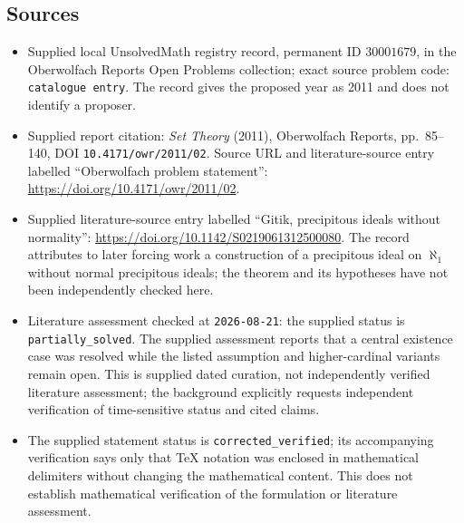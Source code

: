 \documentclass[11pt]{article}
\begin{document}
\subsection{Sources}
\begin{itemize}
\item Supplied local UnsolvedMath registry record, permanent ID \(30001679\), in the Oberwolfach Reports Open Problems collection; exact source problem code: \texttt{catalogue entry}. The record gives the proposed year as 2011 and does not identify a proposer.
\item Supplied report citation: \emph{Set Theory} (2011), Oberwolfach Reports, pp.~85--140, DOI \texttt{10.4171/owr/2011/02}. Source URL and literature-source entry labelled ``Oberwolfach problem statement'': \url{https://doi.org/10.4171/owr/2011/02}.
\item Supplied literature-source entry labelled ``Gitik, precipitous ideals without normality'': \url{https://doi.org/10.1142/S0219061312500080}. The record attributes to later forcing work a construction of a precipitous ideal on \(\aleph_1\) without normal precipitous ideals; the theorem and its hypotheses have not been independently checked here.
\item Literature assessment checked at \texttt{2026-08-21}: the supplied status is \texttt{partially\_solved}. The supplied assessment reports that a central existence case was resolved while the listed assumption and higher-cardinal variants remain open. This is supplied dated curation, not independently verified literature assessment; the background explicitly requests independent verification of time-sensitive status and cited claims.
\item The supplied statement status is \texttt{corrected\_verified}; its accompanying verification says only that TeX notation was enclosed in mathematical delimiters without changing the mathematical content. This does not establish mathematical verification of the formulation or literature assessment.
\end{itemize}
\end{document}
